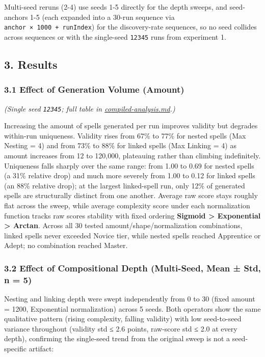 \documentclass[
  10pt,
  twocolumn]{article}
\begin{document}
Multi-seed reruns (2-4) use seeds 1-5 directly for the depth sweeps, and
seed-anchors 1-5 (each expanded into a 30-run sequence via
\texttt{anchor\ ×\ 1000\ +\ runIndex}) for the discovery-rate sequences,
so no seed collides across sequences or with the single-seed
\texttt{12345} runs from experiment 1.

\subsection{3. Results}\label{3-results}

\subsubsection{3.1 Effect of Generation Volume
(Amount)}\label{31-effect-of-generation-volume-amount}

\emph{(Single seed \texttt{12345}; full table in
\url{compiled-analysis.md}.)}

Increasing the amount of spells generated per run improves validity but
degrades within-run uniqueness. Validity rises from 67\% to 77\% for
nested spells (Max Nesting = 4) and from 73\% to 88\% for linked spells
(Max Linking = 4) as amount increases from 12 to 120,000, plateauing
rather than climbing indefinitely. Uniqueness falls sharply over the
same range: from 1.00 to 0.69 for nested spells (a 31\% relative drop)
and much more severely from 1.00 to 0.12 for linked spells (an 88\%
relative drop); at the largest linked-spell run, only 12\% of generated
spells are structurally distinct from one another. Average raw score
stays roughly flat across the sweep, while average complexity score
under each normalization function tracks raw score\textquotesingle s
stability with fixed ordering \textbf{Sigmoid \textgreater{} Exponential
\textgreater{} Arctan}. Across all 30 tested amount/shape/normalization
combinations, linked spells never exceeded Novice tier, while nested
spells reached Apprentice or Adept; no combination reached Master.

\subsubsection{3.2 Effect of Compositional Depth (Multi-Seed, Mean ±
Std, n =
5)}\label{32-effect-of-compositional-depth-multi-seed-mean--std-n--5}

Nesting and linking depth were swept independently from 0 to 30 (fixed
amount = 1200, Exponential normalization) across 5 seeds. Both operators
show the same qualitative pattern (rising complexity, falling validity)
with low seed-to-seed variance throughout (validity std ≤ 2.6 points,
raw-score std ≤ 2.0 at every depth), confirming the single-seed trend
from the original sweep is not a seed-specific artifact:
\end{document}
